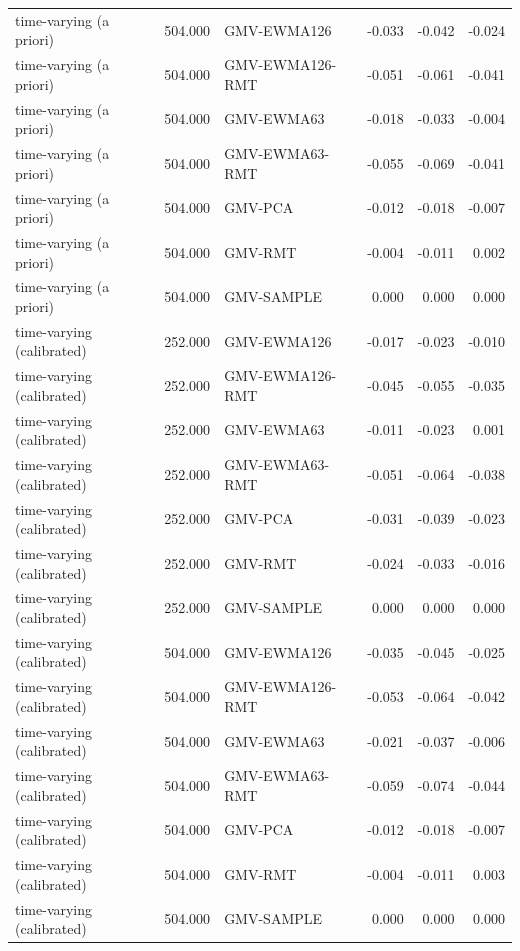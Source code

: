 \begin{table}[t]
{\begin{tabular}{lrlrrr}
time-varying (a priori) & 504.000 & GMV-EWMA126 & -0.033 & -0.042 & -0.024 \\
time-varying (a priori) & 504.000 & GMV-EWMA126-RMT & -0.051 & -0.061 & -0.041 \\
time-varying (a priori) & 504.000 & GMV-EWMA63 & -0.018 & -0.033 & -0.004 \\
time-varying (a priori) & 504.000 & GMV-EWMA63-RMT & -0.055 & -0.069 & -0.041 \\
time-varying (a priori) & 504.000 & GMV-PCA & -0.012 & -0.018 & -0.007 \\
time-varying (a priori) & 504.000 & GMV-RMT & -0.004 & -0.011 & 0.002 \\
time-varying (a priori) & 504.000 & GMV-SAMPLE & 0.000 & 0.000 & 0.000 \\
time-varying (calibrated) & 252.000 & GMV-EWMA126 & -0.017 & -0.023 & -0.010 \\
time-varying (calibrated) & 252.000 & GMV-EWMA126-RMT & -0.045 & -0.055 & -0.035 \\
time-varying (calibrated) & 252.000 & GMV-EWMA63 & -0.011 & -0.023 & 0.001 \\
time-varying (calibrated) & 252.000 & GMV-EWMA63-RMT & -0.051 & -0.064 & -0.038 \\
time-varying (calibrated) & 252.000 & GMV-PCA & -0.031 & -0.039 & -0.023 \\
time-varying (calibrated) & 252.000 & GMV-RMT & -0.024 & -0.033 & -0.016 \\
time-varying (calibrated) & 252.000 & GMV-SAMPLE & 0.000 & 0.000 & 0.000 \\
time-varying (calibrated) & 504.000 & GMV-EWMA126 & -0.035 & -0.045 & -0.025 \\
time-varying (calibrated) & 504.000 & GMV-EWMA126-RMT & -0.053 & -0.064 & -0.042 \\
time-varying (calibrated) & 504.000 & GMV-EWMA63 & -0.021 & -0.037 & -0.006 \\
time-varying (calibrated) & 504.000 & GMV-EWMA63-RMT & -0.059 & -0.074 & -0.044 \\
time-varying (calibrated) & 504.000 & GMV-PCA & -0.012 & -0.018 & -0.007 \\
time-varying (calibrated) & 504.000 & GMV-RMT & -0.004 & -0.011 & 0.003 \\
time-varying (calibrated) & 504.000 & GMV-SAMPLE & 0.000 & 0.000 & 0.000 \\
\bottomrule
\end{tabular}}
\end{table}
